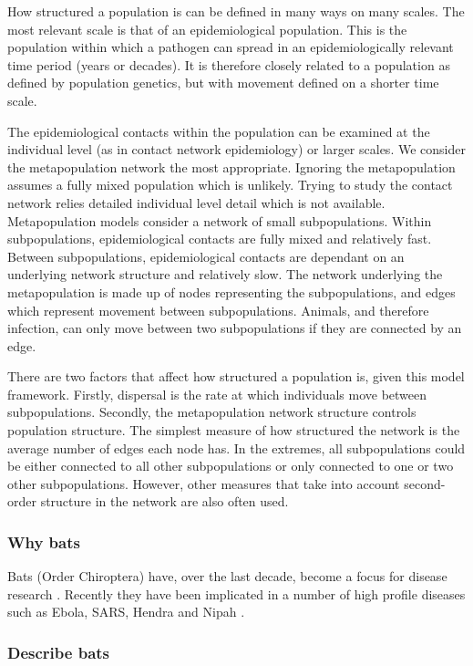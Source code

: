 How structured a population is can be defined in many ways on many scales.
The most relevant scale is that of an epidemiological population.
This is the population within which a pathogen can spread in an epidemiologically relevant time period (years or decades).
It is therefore closely related to a population as defined by population genetics, but with movement defined on a shorter time scale.

The epidemiological contacts within the population can be examined at the individual level (as in contact network epidemiology) or larger scales.
We consider the metapopulation network the most appropriate.
Ignoring the metapopulation assumes a fully mixed population which is unlikely.
Trying to study the contact network relies detailed individual level detail which is not available.
Metapopulation models consider a network of small subpopulations. 
Within subpopulations, epidemiological contacts are fully mixed and relatively fast.
Between subpopulations, epidemiological contacts are dependant on an underlying network structure and relatively slow.
The network underlying the metapopulation is made up of nodes representing the subpopulations, and edges which represent movement between subpopulations.
Animals, and therefore infection, can only move between two subpopulations if they are connected by an edge.

There are two factors that affect how structured a population is, given this model framework.
Firstly, dispersal is the rate at which individuals move between subpopulations.
Secondly, the metapopulation network structure controls population structure.
The simplest measure of how structured the network is the average number of edges each node has.
In the extremes, all subpopulations could be either connected to all other subpopulations or only connected to one or two other subpopulations.
However, other measures that take into account second-order structure in the network are also often used.




\subsubsection{Why bats}
Bats (Order Chiroptera) have, over the last decade, become a focus for disease research  \cite{calisher2006bats, hughes2007emerging}.
Recently they have been implicated in a number of high profile diseases such as Ebola, SARS, Hendra and Nipah  \cite{calisher2006bats, li2005bats}.


\subsubsection{Describe bats}

